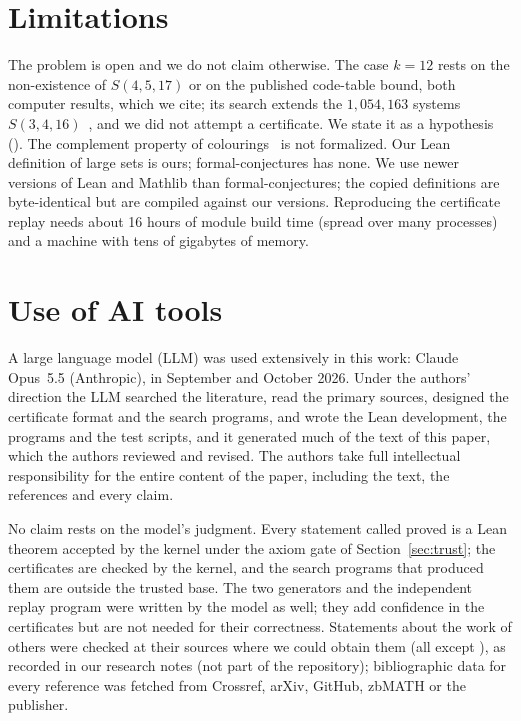 \documentclass[11pt]{article}
\theoremstyle{plain}
\newcommand{\lean}[1]{\brktt{#1}}
\begin{document}
\section{Limitations}\label{sec:limits}

The problem is open and we do not claim otherwise. The case $k=12$ rests on the non-existence of $S(4,5,17)$ or on the published code-table bound, both computer results, which we cite; its search extends the $1{,}054{,}163$ systems $S(3,4,16)$~\cite{KOP}, and we did not attempt a certificate. We state it as a hypothesis (\lean{Veles.Results.not\_property\_12\_of}). The complement property of colourings~\cite{Forum} is not formalized. Our Lean definition of large sets is ours; formal-conjectures has none. We use newer versions of Lean and Mathlib than formal-conjectures; the copied definitions are byte-identical but are compiled against our versions. Reproducing the certificate replay needs about 16 hours of module build time (spread over many processes) and a machine with tens of gigabytes of memory.

\section{Use of AI tools}\label{sec:ai}

A large language model (LLM) was used extensively in this work: Claude Opus~5.5 (Anthropic), in September and October 2026. Under the authors' direction the LLM searched the literature, read the primary sources, designed the certificate format and the search programs, and wrote the Lean development, the programs and the test scripts, and it generated much of the text of this paper, which the authors reviewed and revised. The authors take full intellectual responsibility for the entire content of the paper, including the text, the references and every claim.

No claim rests on the model's judgment. Every statement called proved is a Lean theorem accepted by the kernel under the axiom gate of Section~\ref{sec:trust}; the certificates are checked by the kernel, and the search programs that produced them are outside the trusted base. The two generators and the independent replay program were written by the model as well; they add confidence in the certificates but are not needed for their correctness. Statements about the work of others were checked at their sources where we could obtain them (all except \cite{MendelsohnHung,KramerMesner,Cayley}), as recorded in our research notes (not part of the repository); bibliographic data for every reference was fetched from Crossref, arXiv, GitHub, zbMATH or the publisher.
\end{document}
